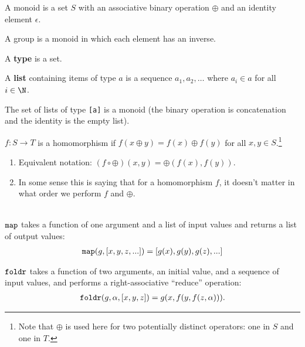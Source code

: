 \newcommand{\map}{\text{{\tt map}}}
\newcommand{\foldr}{\text{{\tt foldr}}}
\newcommand{\op}{\oplus}
\newcommand{\id}{\epsilon}

\begin{definition*}
  A monoid is a set $S$ with an associative binary operation $\op$ and an identity element $\id$.
\end{definition*}

\begin{remark*}
  A group is a monoid in which each element has an inverse.
\end{remark*}

\begin{definition*}
  A {\bf type} is a set.
\end{definition*}

\begin{definition*}
  A {\bf list} containing items of type $a$ is a sequence $a_1, a_2, \ldots$ where $a_i \in a$ for
  all $i \in \N$.
\end{definition*}

\begin{example*}\hspace{0pt}
  The set of lists of type \texttt{[a]} is a monoid (the binary operation is
  concatenation and the identity is the empty list).
\end{example*}

\begin{definition*}
  $f:S \to T$ is a homomorphism if $f(x \op y) = f(x) \op f(y)$ for all $x, y \in S$.\footnote{Note that $\op$ is used here for two potentially distinct operators: one in $S$ and one
    in $T$.}
\end{definition*}

\begin{remark*}\hspace{0pt}
  \begin{enumerate}
  \item Equivalent notation: $(f \circ \op)(x, y) = \op(f(x), f(y))$.
  \item In some sense this is saying that for a homomorphism $f$, it doesn't matter in what order
    we perform $f$ and $\op$.
  \end{enumerate}

\end{remark*}

\begin{definition*}[$\map$, $\foldr$]\hspace{0pt}\\
  $\map$ takes a function of one argument and a list of input values and returns a list of output
  values:
  \begin{align*}
    \map(g, [x, y, z, ...]) = [g(x), g(y), g(z), ...]
  \end{align*}

  $\foldr$ takes a function of two arguments, an initial value, and a sequence of input values, and
  performs a right-associative ``reduce'' operation:
  \begin{align*}
    \foldr(g, \alpha, [x, y, z]) = g(x, f(y, f(z, \alpha))).
  \end{align*}
\end{definition*}

